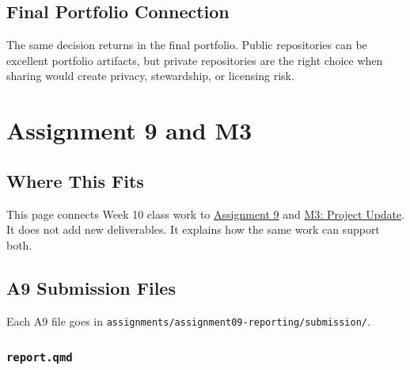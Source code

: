 \documentclass[
  letterpaper,
  DIV=11,
  numbers=noendperiod,
  oneside]{scrreprt}
\begin{document}
\section*{Final Portfolio Connection}\label{final-portfolio-connection}


The same decision returns in the final portfolio. Public repositories
can be excellent portfolio artifacts, but private repositories are the
right choice when sharing would create privacy, stewardship, or
licensing risk.

\chapter*{Assignment 9 and M3}\label{assignment-9-and-m3}


\section*{Where This Fits}\label{where-this-fits-22}


This page connects Week 10 class work to
\href{../../assignments/assignment09-reporting/README.md}{Assignment 9}
and \href{../../milestones/m3-project-update/README.md}{M3: Project
Update}. It does not add new deliverables. It explains how the same work
can support both.

\section*{A9 Submission Files}\label{a9-submission-files}


Each A9 file goes in
\texttt{assignments/assignment09-reporting/submission/}.

\subsection*{\texorpdfstring{\texttt{report.qmd}}{report.qmd}}\label{report.qmd}
\end{document}
